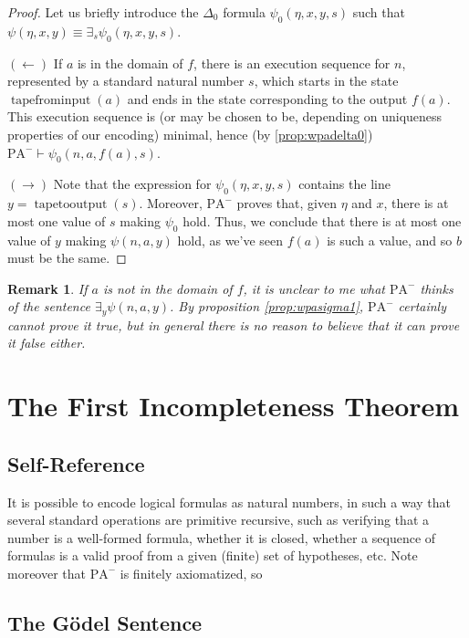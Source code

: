 \documentclass{article}
\newtheorem{remark}[theorem]{Remark}
\theoremstyle{nonumberplain}
\newtheorem{proof}{Proof}
\newcommand{\PA}{\mathrm{PA}}
\newcommand{\WPA}{\PA^-}
\DeclareMathOperator{\tapefrominput}{tapefrominput}
\DeclareMathOperator{\tapetooutput}{tapetooutput}
\begin{document}
\begin{proof}
Let us briefly introduce the $\Delta_0$ formula $\psi_0(\eta,x,y,s)$ such that $\psi(\eta,x,y) \equiv \exists_s \psi_0(\eta,x,y,s)$.

$(\leftarrow)$ If $a$ is in the domain of $f$, there is an execution sequence for $n$, represented by a standard natural number $s$, which starts in the state $\tapefrominput(a)$ and ends in the state corresponding to the output $f(a)$. This execution sequence is (or may be chosen to be, depending on uniqueness properties of our encoding) minimal, hence (by \ref{prop:wpadelta0}) $\WPA \vdash \psi_0(n,a,f(a),s)$.

$(\rightarrow)$ Note that the expression for $\psi_0(\eta,x,y,s)$ contains the line $y = \tapetooutput(s)$. Moreover, $\WPA$ proves that, given $\eta$ and $x$, there is at most one value of $s$ making $\psi_0$ hold. Thus, we conclude that there is at most one value of $y$ making $\psi(n,a,y)$ hold, as we've seen $f(a)$ is such a value, and so $b$ must be the same.
\end{proof}

\begin{remark}
If $a$ is not in the domain of $f$, it is unclear to me what $\WPA$ thinks of the sentence $\exists_y \psi(n,a,y)$. By proposition \ref{prop:wpasigma1}, $\WPA$ certainly cannot prove it true, but in general there is no reason to believe that it can prove it false either.
\end{remark}

\section{The First Incompleteness Theorem}

\subsection{Self-Reference}

It is possible to encode logical formulas as natural numbers, in such a way that several standard operations are primitive recursive, such as verifying that a number is a well-formed formula, whether it is closed, whether a sequence of formulas is a valid proof from a given (finite) set of hypotheses, etc. Note moreover that $\WPA$ is finitely axiomatized, so


\subsection{The Gödel Sentence}
\end{document}
